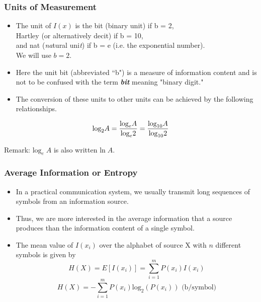 \documentclass[a4]{beamer}
\begin{document}
\begin{frame}
\frametitle{Units of Measurement}
\begin{itemize}
\item The unit of $I(x)$ is the bit (binary unit) if b = 2, \\ Hartley (or alternatively decit) if b = 10,\\ and nat (\emph{na}tural uni\emph{t}) if b = e (i.e. the exponential number).  \\ We will use $b = 2$. \item Here the unit bit (abbreviated ``b") is a measure of information content and is not to be confused with the term \emph{\textbf{bit}} meaning "binary digit." \item The conversion of these
units to other units can be achieved by the following relationships.
\end{itemize}

\[ \mbox{log}_2A = {\mbox{log}_e A \over \mbox{log} _e 2}   = {\mbox{log}_{10} A \over \mbox{log}_{10} 2}  \]

Remark: $ \mbox{log}_e\; A $ is also written $\mbox{ln}\; A$.
\end{frame}

\begin{frame}
\frametitle{Average Information or Entropy}
\begin{itemize}
\item In a practical communication system, we usually transmit long sequences of symbols from an
information source. \item Thus, we are more interested in the average information that a source produces
than the information content of a single symbol.
\item The mean value of $ I(x_i)$ over the alphabet of source X with $n$ different symbols is given by
\[ H(X) = E[I(x_i)] = \sum^m_{i=1} P(x_i)I(x_i) \]
\[ H(X) =  - \sum^m_{i=1} P(x_i)\mbox{log}_2( P(x_i) ) \mbox{        (b/symbol)}\]
\end{itemize}
\end{frame}
\end{document}
